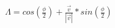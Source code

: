 \documentclass[preview]{standalone}
\begin{document}
\begin{align*}
\Lambda = cos(\frac{\phi}{2}) + \frac{\vec{v}}{|\vec{v}|}*sin(\frac{\phi}{2})
\end{align*}
\end{document}
